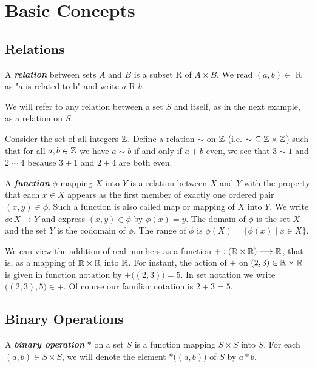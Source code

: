 \chapter{Basic Concepts}

\section{Relations}
\begin{mydef}
    A \textbf{\textit{relation}} between sets \(A\) and \(B\) is a subset R of \(A\times B\). We read \((a,b)\in\) R as "a is related to b" and write \(a\) R \(b\).
\end{mydef}

We will refer to any relation between a set \(S\) and itself, as in the next example, as a relation on \(S\).

\begin{example}
Consider the set of all integers \(\mathbb{Z}\). Define a relation \(\sim\) on \(\mathbb{Z}\) (i.e. \(\sim\ \subseteq \mathbb{Z}\times \mathbb{Z}\)) such that for all \(a,b \in \mathbb{Z}\) we have \(a \sim b \) if and only if \(a+b\) even, we see that \(3 \sim 1\) and \(2 \sim 4 \) because \(3+1\) and \(2+4\) are both even.
\end{example}

\begin{mydef}
    A \textit{\textbf{function}} \(\phi\) mapping \(X\) into \(Y\) is a relation between \(X\) and \(Y\) with the property that each \(x\in X\) appears as the first member of exactly one ordered pair \((x,y)\in \phi\). Such a function is also called map or mapping of \(X\) into \(Y\). We write \(\phi:X\longrightarrow Y\) and express \((x,y)\in \phi\) by \(\phi(x)=y\). The domain of \(\phi\) is the set \(X\) and the set \(Y\) is the codomain of \(\phi\). The range of \(\phi\) is \(\phi(X)=\{\phi(x) \mid x\in X\}\).
\end{mydef}

\begin{example}
    We can view the addition of real numbers as a function \(+:(\mathbb{R}\times \mathbb{R})\longrightarrow \mathbb{R}\), that is, as a mapping of \(\mathbb{R}\times \mathbb{R}\) into \(\mathbb{R}\). For instant, the action of \(+\) on \((2,3) \in \mathbb{R}\times \mathbb{R}\) is given in function notation by \(+\bigl((2,3)\bigr)=5\). In set notation we write \(\bigl((2,3),5\bigr) \in +\). Of course our familiar notation is \(2+3=5\).
    \end{example}

\section{Binary Operations}
\begin{mydef}
    A \textbf{\textit{binary operation}} \(*\) on a set \(S\) is a function mapping \(S\times S\) into \(S\). For each \((a,b) \in S\times S\), we will denote the element \(*\bigl((a,b)\bigr)\) of \(S\) by \(a*b\).
\end{mydef}

